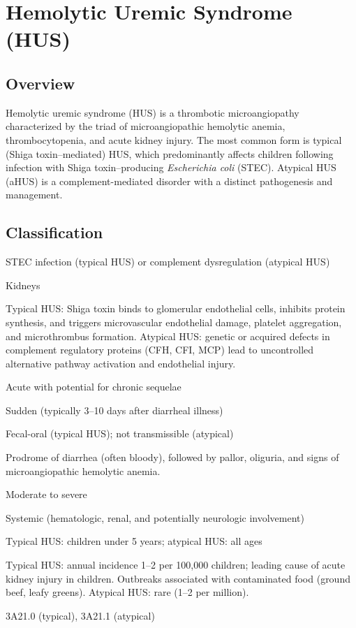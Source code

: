 \chapter{Hemolytic Uremic Syndrome (HUS)}
\label{sec:Hemolytic Uremic Syndrome (HUS)}

\section{Overview}
Hemolytic uremic syndrome (HUS) is a thrombotic microangiopathy characterized by the triad of microangiopathic hemolytic anemia, thrombocytopenia, and acute kidney injury. The most common form is typical (Shiga toxin--mediated) HUS, which predominantly affects children following infection with Shiga toxin--producing \emph{Escherichia coli} (STEC). Atypical HUS (aHUS) is a complement-mediated disorder with a distinct pathogenesis and management.

\section{Classification}
\begin{description}[font=\normalfont\bfseries,leftmargin=3em,labelwidth=2.5em]
  \item[Cause] STEC infection (typical HUS) or complement dysregulation (atypical HUS)
  \item[Organ System] Kidneys
  \item[Pathophysiology] Typical HUS: Shiga toxin binds to glomerular endothelial cells, inhibits protein synthesis, and triggers microvascular endothelial damage, platelet aggregation, and microthrombus formation. Atypical HUS: genetic or acquired defects in complement regulatory proteins (CFH, CFI, MCP) lead to uncontrolled alternative pathway activation and endothelial injury.
  \item[Duration] Acute with potential for chronic sequelae
  \item[Onset] Sudden (typically 3--10 days after diarrheal illness)
  \item[Mode of Transmission] Fecal-oral (typical HUS); not transmissible (atypical)
  \item[Clinical Course] Prodrome of diarrhea (often bloody), followed by pallor, oliguria, and signs of microangiopathic hemolytic anemia.
  \item[Severity] Moderate to severe
  \item[Extent of Disease] Systemic (hematologic, renal, and potentially neurologic involvement)
  \item[Age Group] Typical HUS: children under 5 years; atypical HUS: all ages
  \item[Epidemiology] Typical HUS: annual incidence 1--2 per 100,000 children; leading cause of acute kidney injury in children. Outbreaks associated with contaminated food (ground beef, leafy greens). Atypical HUS: rare (1--2 per million).
  \item[ICD-11 Code] 3A21.0 (typical), 3A21.1 (atypical)
\end{description}

